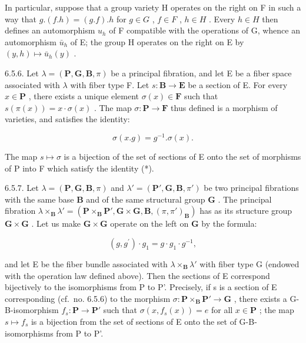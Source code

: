 In particular, suppose that a group variety H operates on the right on F in such a way that \(g.(f.h) = (g.f).h\) for \(g \in G\) , \(f \in F\) , \(h \in H\) . Every \(h \in H\) then defines an automorphism \(u_h\) of F compatible with the operations of G, whence an automorphism \(\bar{u}_h\) of E; the group H operates on the right on E by \((y,h) \mapsto \bar{u}_h(y)\) .

6.5.6. Let \(\lambda = (\mathbf{P},\mathbf{G},\mathbf{B},\pi)\) be a principal fibration, and let E be a fiber space associated with \(\lambda\) with fiber type F. Let \(s: \mathbf{B} \to \mathbf{E}\) be a section of E. For every \(x \in \mathbf{P}\) , there exists a unique element \(\sigma(x) \in \mathbf{F}\) such that \(s(\pi(x)) = x \cdot \sigma(x)\) . The map \(\sigma: \mathbf{P} \to \mathbf{F}\) thus defined is a morphism of varieties, and satisfies the identity:

\[
\sigma (x. g) = g ^ {- 1}. \sigma (x).\tag{*}
\]

The map \(s \mapsto \sigma\) is a bijection of the set of sections of E onto the set of morphisms of P into F which satisfy the identity (*).

6.5.7. Let \(\lambda = (\mathbf{P}, \mathbf{G}, \mathbf{B}, \pi)\) and \(\lambda' = (\mathbf{P}', \mathbf{G}, \mathbf{B}, \pi')\) be two principal fibrations with the same base \(\mathbf{B}\) and of the same structural group \(\mathbf{G}\) . The principal fibration \(\lambda \times_{\mathbf{B}} \lambda' = (\mathbf{P} \times_{\mathbf{B}} \mathbf{P}', \mathbf{G} \times \mathbf{G}, \mathbf{B}, (\pi, \pi')_{\mathbf{B}})\) has as its structure group \(\mathbf{G} \times \mathbf{G}\) . Let us make \(\mathbf{G} \times \mathbf{G}\) operate on the left on \(\mathbf{G}\) by the formula:

\[
(g, g ^ {\prime}) \cdot g _ {1} = g \cdot g _ {1} \cdot g ^ {- 1},
\]

and let E be the fiber bundle associated with \(\lambda \times_{\mathbf{B}} \lambda'\) with fiber type G (endowed with the operation law defined above). Then the sections of E correspond bijectively to the isomorphisms from P to P'. Precisely, if s is a section of E corresponding (cf.~no. 6.5.6) to the morphism \(\sigma: \mathbf{P} \times_{\mathbf{B}} \mathbf{P}' \to \mathbf{G}\) , there exists a G-B-isomorphism \(f_s: \mathbf{P} \to \mathbf{P}'\) such that \(\sigma(x, f_s(x)) = e\) for all \(x \in \mathbf{P}\) ; the map \(s \mapsto f_s\) is a bijection from the set of sections of E onto the set of G-B-isomorphisms from P to P'.

